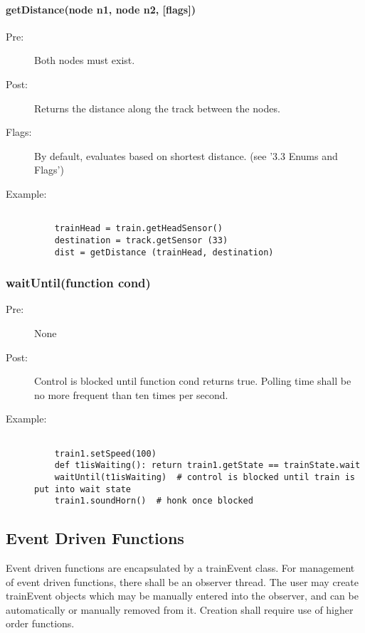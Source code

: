 \documentclass[a4paper,11pt,notitlepage]{article}
\begin{document}
\paragraph{getDistance(node n1, node n2, [flags])}
\begin{description}
\item[\hspace{1cm}Pre:] Both nodes must exist.
\item[\hspace{1cm}Post:] Returns the distance along the track between the nodes.
\item[\hspace{1cm}Flags:] By default, evaluates based on shortest distance. (see '3.3 Enums and Flags')
\item[\hspace{1cm}Example:]
\begin{verbatim}

    trainHead = train.getHeadSensor()
    destination = track.getSensor (33)
    dist = getDistance (trainHead, destination)
\end{verbatim}
\end{description}


\subsubsection{waitUntil(function cond)}
\begin{description}
\item[\hspace{1cm}Pre:] None
\item[\hspace{1cm}Post:] Control is blocked until function cond returns true. Polling time shall be no more frequent than ten times per second.
\item[\hspace{1cm}Example:]
\begin{verbatim}

    train1.setSpeed(100)
    def t1isWaiting(): return train1.getState == trainState.wait
    waitUntil(t1isWaiting)  # control is blocked until train is put into wait state
    train1.soundHorn()  # honk once blocked
\end{verbatim}
\end{description}

\subsection{Event Driven Functions}
Event driven functions are encapsulated by a trainEvent class. For management of event driven functions, there shall be an observer thread. The user may create trainEvent objects which may be manually entered into the observer, and can be automatically or manually removed from it. Creation shall require use of higher order functions.
\end{document}
